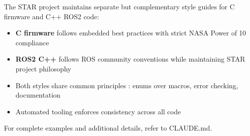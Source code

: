 The STAR project maintains separate but complementary style guides for C firmware and C++ ROS2 code:

\begin{itemize}
\item \textbf{C firmware} follows embedded best practices with strict NASA Power
    of 10 compliance
  \item \textbf{ROS2 C++} follows ROS community
        conventions while maintaining STAR project philosophy
  \item Both styles share common principles
    : enums over macros,
      error checking,
      documentation
  \item Automated tooling enforces consistency across all code
\end{itemize}

      For complete examples and additional details,
      refer to CLAUDE.md.
